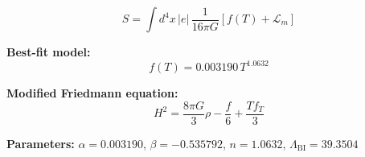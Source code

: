 
\begin{equation}
  S = \int d^4x \, |e| \, \frac{1}{16\pi G} \left[ f(T) + \mathcal{L}_m \right]
\end{equation}

\textbf{Best-fit model:}
\begin{equation}
  f(T) = 0.003190 \, T^{1.0632}
\end{equation}

\textbf{Modified Friedmann equation:}
\begin{equation}
  H^2 = \frac{8\pi G}{3} \rho - \frac{f}{6} + \frac{T f_T}{3}
\end{equation}

\textbf{Parameters:}
$\alpha = 0.003190$, \quad
$\beta = -0.535792$, \quad
$n = 1.0632$, \quad
$\Lambda_{\text{BI}} = 39.3504$